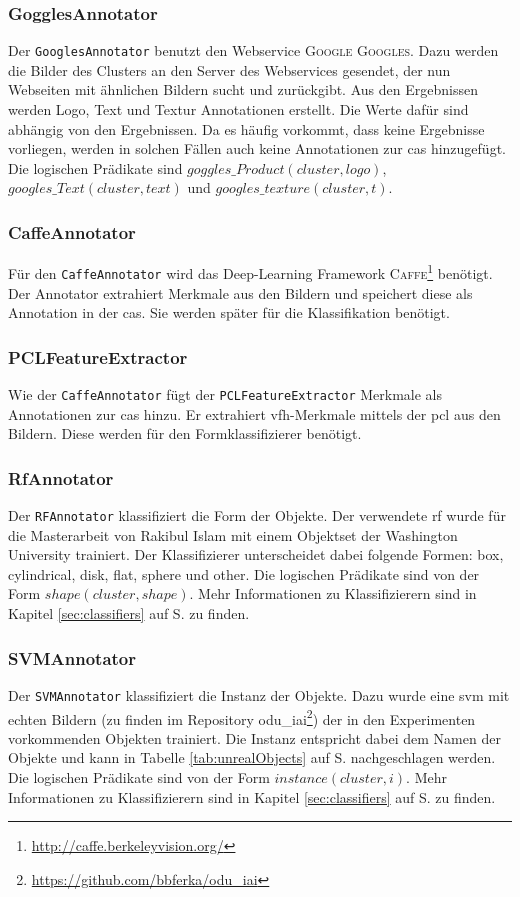 \subsubsection{GogglesAnnotator}
Der \texttt{GooglesAnnotator} benutzt den Webservice \textsc{Google Googles}. Dazu werden die Bilder des Clusters an den Server des Webservices gesendet, der nun Webseiten mit ähnlichen Bildern sucht und zurückgibt. Aus den Ergebnissen werden Logo, Text und Textur Annotationen erstellt. Die Werte dafür sind abhängig von den Ergebnissen. Da es häufig vorkommt, dass keine Ergebnisse vorliegen, werden in solchen Fällen auch keine Annotationen zur \gls{cas} hinzugefügt. Die logischen Prädikate sind $goggles\_Product(cluster, logo)$, $googles\_Text(cluster, text)$ und $googles\_texture(cluster, t)$. 

\subsubsection{CaffeAnnotator}
Für den \texttt{CaffeAnnotator} wird das Deep-Learning Framework \textsc{Caffe}\footnote{\url{http://caffe.berkeleyvision.org/}} benötigt. Der Annotator extrahiert Merkmale aus den Bildern und speichert diese als Annotation in der \gls{cas}. Sie werden später für die Klassifikation benötigt.  

\subsubsection{PCLFeatureExtractor}
Wie der \texttt{CaffeAnnotator} fügt der \texttt{PCLFeatureExtractor} Merkmale als Annotationen zur \gls{cas} hinzu. Er extrahiert \gls{vfh}-Merkmale mittels der \gls{pcl} aus den Bildern. Diese werden für den Formklassifizierer benötigt.

\subsubsection{RfAnnotator}
Der \texttt{RFAnnotator} klassifiziert die Form der Objekte. Der verwendete \gls{rf} wurde für die Masterarbeit von Rakibul Islam \cite{rakib} mit einem Objektset der Washington University trainiert. Der Klassifizierer unterscheidet dabei folgende Formen: box, cylindrical, disk, flat, sphere und other. Die logischen Prädikate sind von der Form  $shape(cluster, shape)$. Mehr Informationen zu Klassifizierern sind in Kapitel \ref{sec:classifiers} auf S. \pageref{sec:classifiers} zu finden.

\subsubsection{SVMAnnotator}
Der \texttt{SVMAnnotator} klassifiziert die Instanz der Objekte. Dazu wurde eine \gls{svm} mit echten Bildern (zu finden im Repository odu\_iai\footnote{\url{https://github.com/bbferka/odu\_iai}}) der in den Experimenten vorkommenden Objekten trainiert. Die Instanz entspricht dabei dem Namen der Objekte und kann in Tabelle \ref{tab:unrealObjects} auf S.\pageref{tab:unrealObjects} nachgeschlagen werden. Die logischen Prädikate sind von der Form  $instance(cluster, i)$. Mehr Informationen zu Klassifizierern sind in Kapitel \ref{sec:classifiers} auf S. \pageref{sec:classifiers} zu finden.

